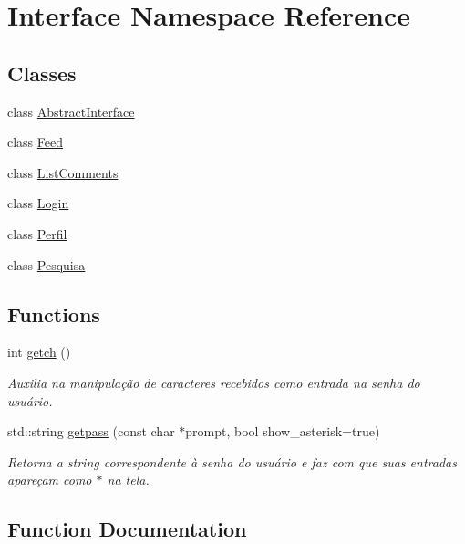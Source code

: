 \hypertarget{namespace_interface}{}\section{Interface Namespace Reference}
\label{namespace_interface}
\subsection*{Classes}
\begin{DoxyCompactItemize}
\item 
class \hyperlink{class_interface_1_1_abstract_interface}{Abstract\+Interface}
\item 
class \hyperlink{class_interface_1_1_feed}{Feed}
\item 
class \hyperlink{class_interface_1_1_list_comments}{List\+Comments}
\item 
class \hyperlink{class_interface_1_1_login}{Login}
\item 
class \hyperlink{class_interface_1_1_perfil}{Perfil}
\item 
class \hyperlink{class_interface_1_1_pesquisa}{Pesquisa}
\end{DoxyCompactItemize}
\subsection*{Functions}
\begin{DoxyCompactItemize}
\item 
int \hyperlink{namespace_interface_ab573d0ce6169f28d527482a31eaa5986}{getch} ()
\begin{DoxyCompactList}\small\item\em Auxilia na manipulação de caracteres recebidos como entrada na senha do usuário. \end{DoxyCompactList}\item 
std\+::string \hyperlink{namespace_interface_aeb08764caefdb64e384ce67ce1b2ed88}{getpass} (const char $\ast$prompt, bool show\+\_\+asterisk=true)
\begin{DoxyCompactList}\small\item\em Retorna a string correspondente à senha do usuário e faz com que suas entradas apareçam como \textquotesingle{}$\ast$\textquotesingle{} na tela. \end{DoxyCompactList}\end{DoxyCompactItemize}


\subsection{Function Documentation}
\mbox{\label{namespace_interface_ab573d0ce6169f28d527482a31eaa5986}} 
